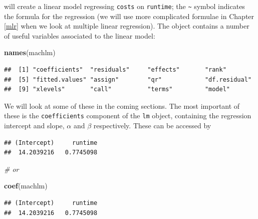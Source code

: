 \documentclass[12pt,a4paper,openany,twoside]{report}
\newenvironment{Shaded}{\begin{snugshade}}{\end{snugshade}}
\newcommand{\CommentTok}[1]{\textcolor[rgb]{0.56,0.35,0.01}{\textit{#1}}}
\newcommand{\KeywordTok}[1]{\textcolor[rgb]{0.13,0.29,0.53}{\textbf{#1}}}
\newcommand{\NormalTok}[1]{#1}
\newcommand{\OperatorTok}[1]{\textcolor[rgb]{0.81,0.36,0.00}{\textbf{#1}}}
\theoremstyle{definition}
\theoremstyle{remark}
\theoremstyle{plain}
\newcommand{\vsps}{\vspace{.5cm}}
\theoremstyle{definition}
\theoremstyle{definition}
\theoremstyle{definition}
\theoremstyle{remark}
\begin{document}
\vsps

will create a linear model regressing \texttt{costs} on \texttt{runtime}; the \texttt{\textasciitilde{}} symbol indicates the formula for the regression (we will use more complicated formulae in Chapter \ref{mlr} when we look at multiple linear regression). The object contains a number of useful variables associated to the linear model:\newline

\begin{Shaded}
\begin{Highlighting}[]
\KeywordTok{names}\NormalTok{(machlm)}
\end{Highlighting}
\end{Shaded}

\begin{verbatim}
##  [1] "coefficients"  "residuals"     "effects"       "rank"         
##  [5] "fitted.values" "assign"        "qr"            "df.residual"  
##  [9] "xlevels"       "call"          "terms"         "model"
\end{verbatim}

\vsps

We will look at some of these in the coming sections. The most important of these is the \texttt{coefficients} component of the \texttt{lm} object, containing the regression intercept and slope, \(\alpha\) and \(\beta\) respectively. These can be accessed by\newline

\begin{Shaded}
\end{Shaded}

\begin{verbatim}
## (Intercept)     runtime 
##  14.2039216   0.7745098
\end{verbatim}

\begin{Shaded}
\begin{Highlighting}[]
\CommentTok{# or }

\KeywordTok{coef}\NormalTok{(machlm)}
\end{Highlighting}
\end{Shaded}

\begin{verbatim}
## (Intercept)     runtime 
##  14.2039216   0.7745098
\end{verbatim}
\end{document}
